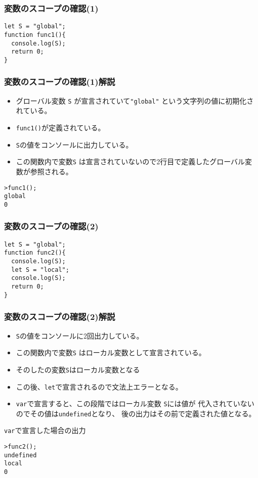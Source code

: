 \begin{frame}[containsverbatim]
\frametitle{変数のスコープの確認(1)}
\begin{Verbatim}
let S = "global";
function func1(){
  console.log(S);
  return 0;
}
\end{Verbatim}
\end{frame}
\begin{frame}[containsverbatim]
\frametitle{変数のスコープの確認(1)解説}
\begin{itemize}
 \item グローバル変数 \Verb+S+ が宣言されていて\Verb+"global"+
       という文字列の値に初期化されている。
 \item \Verb+func1()+が定義されている。
 \item \Verb+S+の値をコンソールに出力している。
 \item この関数内で変数\Verb+S+
       は宣言されていないので2行目で定義したグローバル変数が参照される。
\end{itemize}
\begin{Verbatim}
>func1();
global
0
\end{Verbatim}
\end{frame}
\begin{frame}[containsverbatim]
\frametitle{変数のスコープの確認(2)}
\begin{Verbatim}
let S = "global";
function func2(){
  console.log(S);
  let S = "local";
  console.log(S);
  return 0;
}
\end{Verbatim}
\end{frame}
\begin{frame}[containsverbatim]
\frametitle{変数のスコープの確認(2)解説}
\begin{itemize}
 \item \Verb+S+の値をコンソールに2回出力している。
 \item この関数内で変数\Verb+S+ はローカル変数として宣言されている。
 \item そのしたの変数\Verb+S+はローカル変数となる
 \item この後、\Verb+let+で宣言されるので文法上エラーとなる。
 \item \Verb+var+で宣言すると、この段階ではローカル変数 \Verb+S+には値が
       代入されていないのでその値は\Verb+undefined+となり、
        後の出力はその前で定義された値となる。
\end{itemize}
 \Verb+var+で宣言した場合の出力
\begin{Verbatim}
>func2();
undefined
local    
0
\end{Verbatim}
\end{frame}
